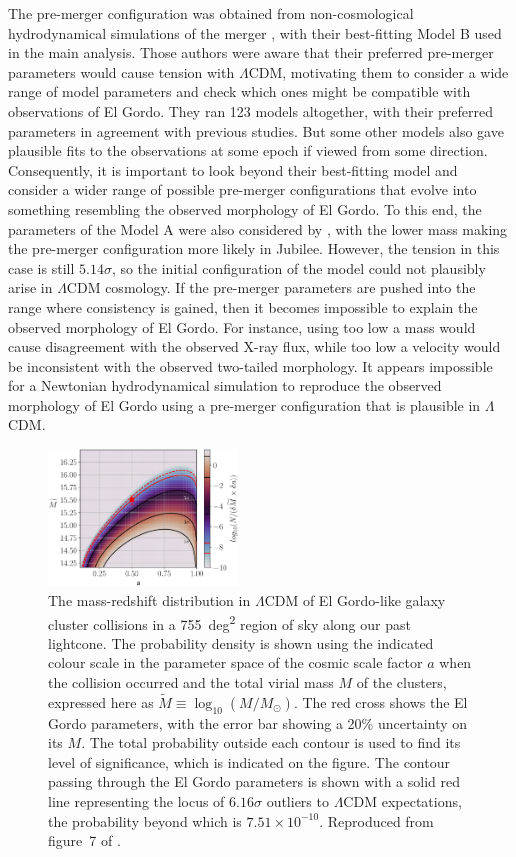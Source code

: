 \documentclass[fleqn,usenatbib,useAMS,onecolumn]{mnras} %
\begin{document}
The pre-merger configuration was obtained from non-cosmological hydrodynamical simulations of the merger \citep{Zhang_2015}, with their best-fitting Model B used in the main analysis. Those authors were aware that their preferred pre-merger parameters would cause tension with $\Lambda$CDM, motivating them to consider a wide range of model parameters and check which ones might be compatible with observations of El Gordo. They ran 123 models altogether, with their preferred parameters in agreement with previous studies. But some other models also gave plausible fits to the observations at some epoch if viewed from some direction. Consequently, it is important to look beyond their best-fitting model and consider a wider range of possible pre-merger configurations that evolve into something resembling the observed morphology of El Gordo. To this end, the parameters of the \citet{Zhang_2015} Model A were also considered by \citet{Asencio_2021}, with the lower mass making the pre-merger configuration more likely in Jubilee. However, the tension in this case is still $5.14\sigma$, so the initial configuration of the model could not plausibly arise in $\Lambda$CDM cosmology. If the pre-merger parameters are pushed into the range where consistency is gained, then it becomes impossible to explain the observed morphology of El Gordo. For instance, using too low a mass would cause disagreement with the observed X-ray flux, while too low a velocity would be inconsistent with the observed two-tailed morphology. It appears impossible for a Newtonian hydrodynamical simulation to reproduce the observed morphology of El Gordo using a pre-merger configuration that is plausible in $\Lambda$CDM.

\begin{figure}
	\centering
	\includegraphics[width=0.45\textwidth]{Asencio_2021_Figure_7}
	\caption{The mass-redshift distribution  in $\Lambda$CDM of El Gordo-like galaxy cluster collisions in a 755~deg\textsuperscript{2} region of sky along our past lightcone. The probability density is shown using the indicated colour scale in the parameter space of the cosmic scale factor $a$ when the collision occurred and the total virial mass $M$ of the clusters, expressed here as $\widetilde{M} \equiv \log_{10} \left( M/M_\odot \right)$. The red cross shows the El Gordo parameters, with the error bar showing a 20\% uncertainty on its $M$. The total probability outside each contour is used to find its level of significance, which is indicated on the figure. The contour passing through the El Gordo parameters is shown with a solid red line representing the locus of $6.16\sigma$ outliers to $\Lambda$CDM expectations, the probability beyond which is $7.51 \times 10^{-10}$. Reproduced from figure~7 of \citet{Asencio_2021}.}
	\label{Asencio_2021_Figure_7}
\end{figure}
\end{document}
